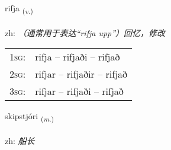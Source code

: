 \documentclass[frontgrid, backgrid]{flacards}\usepackage[]{graphicx}\usepackage[]{color}
\begin{document}
\renewcommand{\blhead}{\vskip5pt {\small\bfseries\footnotesize Sagnorð | 动词 }}
\renewcommand{\bcfoot}{\vskip5pt \hspace{2pt}{\small\bfseries\footnotesize 2K}}


{rifja \small{\textsubscript{(\textit{v.})}} \\[1ex] %
\textphonetic{[rɪvja]} \\
zh: \emph{（通常用于表达“rifja upp”）回忆，修改} \\  [2ex]
\renewcommand*{\arraystretch}{0.8}
\begin{tabular}{p{1cm}l}
\textsc{1sg}: & rifja -- rifjaði -- rifjað \\ 
\textsc{2sg}: & rifjar -- rifjaðir -- rifjað \\ 
\textsc{3sg}: & rifjar -- rifjaði -- rifjað \\ 
\end{tabular}
}

\renewcommand{\flhead}{\vskip5pt \fboxsep=0pt {\small\bfseries\footnotesize Nafnorð | 名词}}
\renewcommand{\fcfoot}{\vskip5pt \fboxsep=0pt \hspace{2pt}{\small\bfseries\footnotesize 2K}}

\renewcommand{\blhead}{\vskip5pt {\small\bfseries\footnotesize Nafnorð | 名词 }}
\renewcommand{\bcfoot}{\vskip5pt \hspace{2pt}{\small\bfseries\footnotesize 2K}}


{skipstjóri \small{\textsubscript{(\textit{m.})}} \\[1ex] %
\textphonetic{[scɪpstjourɪ]} \\
zh: \emph{船长} \\  [2ex]
\renewcommand*{\arraystretch}{0.8}
}
\end{document}
